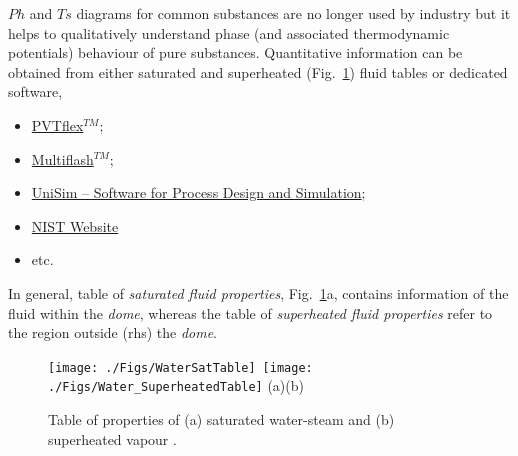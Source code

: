  $Ph$ and $Ts$ diagrams for common substances are no longer used by industry but it helps to qualitatively understand phase (and associated thermodynamic potentials) behaviour of pure substances. Quantitative information can be obtained from either saturated and superheated (Fig.~\ref{Chapter:ThermodynamicPropertiesPureFluids:Fig:Fig03}) fluid tables or dedicated software, \eg
\begin{itemize}
   \item \href{http://www.weatherford.com/doc/wft183650}{PVTflex$^{TM}$};
   \item \href{http://www.kbcat.com/infochem-software/flow-assurance-software-multiflash/pvt-simulation}{Multiflash$^{TM}$};
   \item \href{https://www.honeywellprocess.com/en-US/explore/products/advanced-applications/unisim/Pages/default.aspx}{UniSim – Software for Process Design and Simulation};
   \item \href{http://webbook.nist.gov/chemistry/fluid/}{NIST Website}
   \item etc.
\end{itemize}
In general, table of {\it saturated fluid properties}, Fig.~\ref{Chapter:ThermodynamicPropertiesPureFluids:Fig:Fig03}a, contains information of the fluid within the {\it dome}, whereas the table of {\it superheated fluid properties} refer to the region outside (rhs) the {\it dome}. 
%
   \begin{figure}[h]
      \vbox{
         \hbox{\texttt{[image: ./Figs/WaterSatTable]}
               \texttt{[image: ./Figs/Water\_SuperheatedTable]}}
         \vspace{-1.5cm}
         \hbox{\hspace{4cm}(a)\hspace{7cm}(b)}
      }
      \caption{ Table of properties of (a) saturated water-steam and (b) superheated vapour \citep[Extracted from ][see Appendix~\ref{Appendix:Saturated_SH_Tables}]{Moran_Book}.}\label{Chapter:ThermodynamicPropertiesPureFluids:Fig:Fig03}
   \end{figure}
%
    

